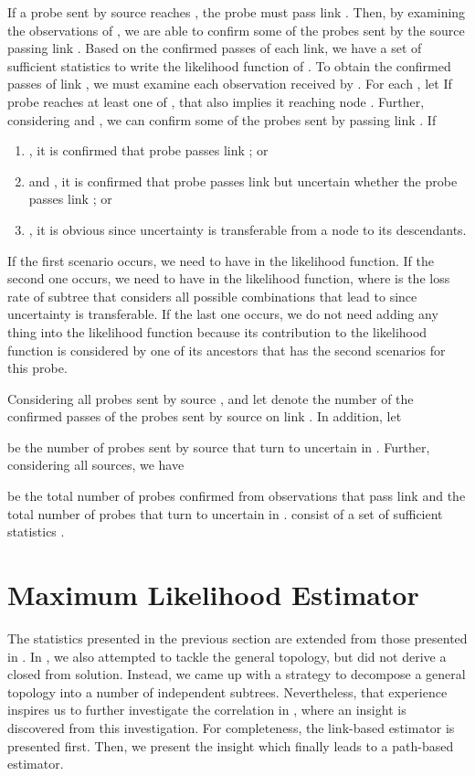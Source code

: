 \documentclass[10pt,twocolumn]{IEEEtran}
\begin{document}
If a probe sent by source  reaches , the probe must pass
link . Then, by examining the observations of , we are able
to confirm some of the probes sent by the source passing link .
Based on the confirmed passes of each link, we have a set of
sufficient statistics to write the likelihood function of . To
obtain the confirmed passes of link , we must examine each
observation received by . For each , let
 \noindent If
 probe  reaches at least one of , that also
implies it reaching node . Further, considering  and
, we can confirm some of the probes sent by 
passing link . If
\begin{enumerate}
\item  , it is confirmed that probe  passes link
; or
\item   and , it is confirmed that probe  passes link   but uncertain whether the probe passes link ; or
\item , it is obvious since uncertainty is transferable from a node to its descendants.
\end{enumerate}

\noindent If the first scenario occurs, we need to have 
in the likelihood function. If the second one occurs, we need to have
 in the likelihood function,
where   is
the loss rate of subtree  that considers all possible combinations
that lead to  since uncertainty is
transferable. If the last one occurs, we do not need adding any thing
into the likelihood function because its contribution to the
likelihood function is considered by one of its ancestors that has the
second scenarios for this probe.

Considering all probes sent by source , and let
 \noindent denote the
number of the confirmed passes of the probes sent by source  on
link . In addition, let


\noindent be the number of probes sent by source  that turn to
uncertain in . Further, considering all sources, we have

\noindent be the total number of probes confirmed from observations
that pass link  and the total number of probes that turn to
uncertain in .  consist of a set of sufficient
statistics \cite{ZD09}.

\section{ Maximum Likelihood Estimator}
The statistics presented in the previous section are extended from
those presented in \cite{ZD09}. In \cite{ZD09}, we also attempted to
tackle the general topology, but did not derive a closed from
solution. Instead, we came up with a strategy to decompose a general
topology into a number of independent subtrees. Nevertheless, that
experience inspires us to further investigate the correlation in
, where an insight is discovered from this investigation. For
completeness, the link-based estimator is presented first. Then, we
present the insight which finally leads to a path-based estimator.
\end{document}
